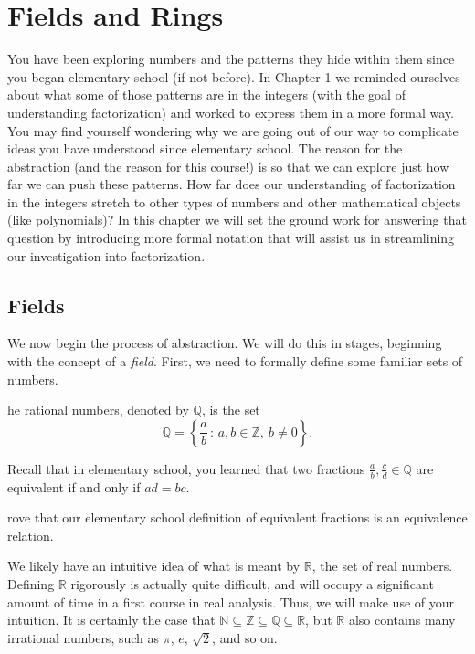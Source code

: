 \documentclass[english,course]{lecture}
\theoremstyle{plain}
\newenvironment{exercise}[1]
  {\renewcommand\theinnerexercise{#1}\innerexercise}
  {\endinnerexercise}
\newenvironment{definition}[1]
  {\renewcommand\theinnerdefinition{#1}\innerdefinition}
  {\endinnerdefinition}
\def\setof#1#2{{\left\{#1\,\colon\,#2\right\}}}
\def\Z{{\mathbb Z}}
\def\Q{{\mathbb Q}}
\def\N{{\mathbb N}}
\def\R{{\mathbb R}}
\begin{document}
\section{Fields and Rings}
You have been exploring numbers and the patterns they hide within them since you began elementary school (if not before). In Chapter 1 we reminded ourselves about what some of those patterns are in the integers (with the goal of understanding factorization) and worked to express them in a more formal way. You may find yourself wondering why we are going out of our way to complicate ideas you have understood since elementary school. The reason for the abstraction (and the reason for this course!) is so that we can explore just how far we can push these patterns. How far does our understanding of factorization in the integers stretch to other types of numbers and other mathematical objects (like polynomials)? In this chapter we will set the ground work for answering that question by introducing more formal notation that will assist us in streamlining our investigation into factorization.


\subsection{Fields}

We now begin the process of abstraction.
We will do this in stages, beginning with the concept of a \emph{field}.
First, we need to formally define some familiar sets of numbers.


\begin{definition}
	The rational numbers, denoted by $\Q$, is the set
	\[
		\Q = \setof{\frac{a}{b}}{a,b\in \Z, \ b\ne 0}.
	\]
\end{definition}

Recall that in elementary school, you learned that two fractions $\frac{a}{b}, \frac{c}{d} \in \Q$ are equivalent if and only if $ad=bc$.

\begin{exercise}
    Prove that our elementary school definition of equivalent fractions is an equivalence relation.
\end{exercise}

We likely have an intuitive idea of what is meant by $\R$, the set of real numbers.
Defining $\R$ rigorously is actually quite difficult, and will occupy a significant amount of time in a first course in real analysis.
Thus, we will make use of your intuition. It is certainly the case that $\N\subseteq \Z\subseteq \Q\subseteq \R$, but $\R$ also contains many irrational numbers, such as $\pi$, $e$, $\sqrt{2}$, and so on.
\end{document}

